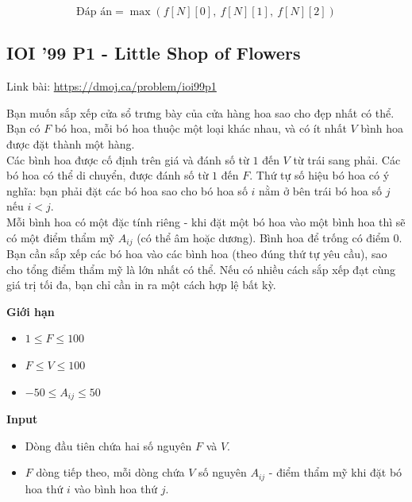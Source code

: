 \documentclass{article}
\begin{document}
\[
\text{Đáp án} = \max \left( f[N][0],\ f[N][1],\ f[N][2] \right)
\]

\subsection{IOI '99 P1 - Little Shop of Flowers}
Link bài: \url{https://dmoj.ca/problem/ioi99p1}
\begin{tcolorbox}[
    colback=blue!5,        %
    colframe=blue!75!black,%
    title={Đề bài}
]
Bạn muốn sắp xếp cửa sổ trưng bày của cửa hàng hoa sao cho đẹp nhất có thể.\\

Bạn có $F$ bó hoa, mỗi bó hoa thuộc một loại khác nhau, và có ít nhất $V$ bình hoa được đặt thành một hàng.\\

Các bình hoa được cố định trên giá và đánh số từ $1$ đến $V$ từ trái sang phải. Các bó hoa có thể di chuyển, được đánh số từ $1$ đến $F$. Thứ tự số hiệu bó hoa có ý nghĩa: bạn phải đặt các bó hoa sao cho bó hoa số $i$ nằm ở bên trái bó hoa số $j$ nếu $i < j$.\\

Mỗi bình hoa có một đặc tính riêng - khi đặt một bó hoa vào một bình hoa thì sẽ có một điểm thẩm mỹ $A_{ij}$ (có thể âm hoặc dương). Bình hoa để trống có điểm $0$.\\

Bạn cần sắp xếp các bó hoa vào các bình hoa (theo đúng thứ tự yêu cầu), sao cho tổng điểm thẩm mỹ là lớn nhất có thể. Nếu có nhiều cách sắp xếp đạt cùng giá trị tối đa, bạn chỉ cần in ra một cách hợp lệ bất kỳ.
\end{tcolorbox}

\textbf{Giới hạn}
\begin{itemize}
    \item $1 \leq F \leq 100$
    \item $F \leq V \leq 100$
    \item $-50 \leq A_{ij} \leq 50$
\end{itemize}

\textbf{Input}
\begin{itemize}
    \item Dòng đầu tiên chứa hai số nguyên $F$ và $V$.
    \item $F$ dòng tiếp theo, mỗi dòng chứa $V$ số nguyên $A_{ij}$ - điểm thẩm mỹ khi đặt bó hoa thứ $i$ vào bình hoa thứ $j$.
\end{itemize}
\end{document}
